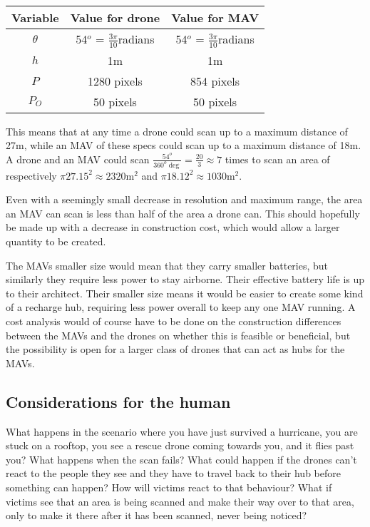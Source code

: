 \documentclass[fleqn,10pt]{wlscirep}
\begin{document}
\begin{table}[h]
\centering
\caption{}
\label{tab:evaluated variables}
\begin{tabular}{|c|c|c|}
  \hline
  Variable & Value for drone & Value for MAV \\
  \hline
  $\theta$ & 54$^o$ = $\frac{3\pi}{10}$radians & 54$^o$ = $\frac{3\pi}{10}$radians \\
  $h$ & 1m & 1m \\
  $P$ & 1280  pixels & 854 pixels \\
  $P_O$ & 50 pixels & 50 pixels \\
  \hline
\end{tabular}
\end{table}

This means that at any time a drone could scan up to a maximum distance of 27m, while an MAV of these specs could scan up to a maximum distance of 18m. A drone and an MAV could scan $\frac{54^o}{360^o \deg } = \frac{20}{3} \approx 7$ times to scan an area of respectively $\pi27.15^2 \approx 2320\text{m}^2$ and $\pi18.12^2 \approx 1030\text{m}^2$.

Even with a seemingly small decrease in resolution and maximum range, the area an MAV can scan is less than half of the area a drone can. This should hopefully be made up with a decrease in construction cost, which would allow a larger quantity to be created.

The MAVs smaller size would mean that they carry smaller batteries, but similarly they require less power to stay airborne. Their effective battery life is up to their architect. Their smaller size means it would be easier to create some kind of a recharge hub, requiring less power overall to keep any one MAV running. A cost analysis would of course have to be done on the construction differences between the MAVs and the drones on whether this is feasible or beneficial, but the possibility is open for a larger class of drones that can act as hubs for the MAVs.

\subsection{Considerations for the human}
What happens in the scenario where you have just survived a hurricane, you are stuck on a rooftop, you see a rescue drone coming towards you, and it flies past you? What happens when the scan fails? What could happen if the drones can't react to the people they see and they have to travel back to their hub before something can happen? How will victims react to that behaviour? What if victims see that an area is being scanned and make their way over to that area, only to make it there after it has been scanned, never being noticed?
\end{document}
